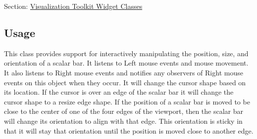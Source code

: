 Section\-: \hyperlink{sec_vtkwidgets}{Visualization Toolkit Widget Classes} \hypertarget{vtkwidgets_vtkxyplotwidget_Usage}{}\subsection{Usage}\label{vtkwidgets_vtkxyplotwidget_Usage}
This class provides support for interactively manipulating the position, size, and orientation of a scalar bar. It listens to Left mouse events and mouse movement. It also listens to Right mouse events and notifies any observers of Right mouse events on this object when they occur. It will change the cursor shape based on its location. If the cursor is over an edge of the scalar bar it will change the cursor shape to a resize edge shape. If the position of a scalar bar is moved to be close to the center of one of the four edges of the viewport, then the scalar bar will change its orientation to align with that edge. This orientation is sticky in that it will stay that orientation until the position is moved close to another edge.

